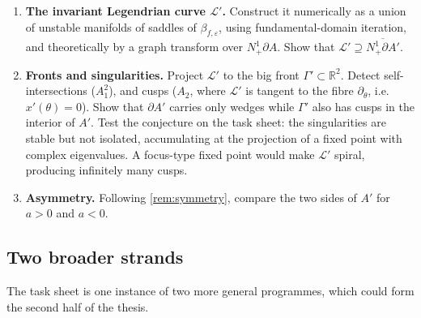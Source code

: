 \documentclass[11pt,a4paper]{article}
\theoremstyle{definition}
\theoremstyle{remark}
\newcommand{\R}{\mathbb{R}}
\newcommand{\eps}{\varepsilon}
\newcommand{\Nb}{N^1_+\partial A}
\begin{document}
\begin{enumerate}[label=\textbf{(\alph*)},leftmargin=*]
  On the opposite side, the pair at $p_-$ is real for $a>0$, with trace $2\lambda+2a\eps/\lambda$. Its larger member exceeds
  $1$ iff $\operatorname{tr}>1+\rho$, i.e.\ iff $a\eps>\lambda(1-\lambda)^2/2$. This is \emph{the same threshold} at which the
  extra fixed points of~(a) appear, with $n_1\to-1$ as $a\eps\downarrow\lambda(1-\lambda)^2/2$. This strongly suggests a pitchfork
  bifurcation at $p_-$ (reflection-symmetric, hence a pitchfork) that turns $p_-$ into a saddle and creates the two new
  sinks. Numerically, at $\lambda=0.6$, $\eps=0.5$, $a=0.2$ the spectrum at $p_-$ is $\{0.36,1.244,0.289\}$.
  It is a natural candidate for singularities born while the eigenvalues are still \emph{real}, which is the task sheet's
  second question. The next steps are to relate the focus at $p_+$ and the saddle at $p_-$ to the geometry of
  $\mathcal{L}'$ near these points.
  \item \textbf{The invariant Legendrian curve $\mathcal{L}'$.} Construct it numerically as a union of unstable
  manifolds of saddles of $\beta_{f,\eps}$, using fundamental-domain iteration, and theoretically by a graph transform
  over $\Nb$. Show that $\mathcal{L}'\supseteq\overline{N^1_+\partial A'}$.
  \item \textbf{Fronts and singularities.} Project $\mathcal{L}'$ to the big front $\Gamma'\subset\R^2$. Detect
  self-intersections ($A_1^2$), and cusps ($A_2$, where $\mathcal{L}'$ is tangent to the fibre $\partial_\theta$, i.e.\
  $x'(\theta)=0$). Show that $\partial A'$ carries only wedges while $\Gamma'$ also has cusps in the interior of $A'$.
  Test the conjecture on the task sheet: the singularities are stable but not isolated, accumulating at the projection
  of a fixed point with complex eigenvalues. A focus-type fixed point would make $\mathcal{L}'$ spiral, producing
  infinitely many cusps.
  \item \textbf{Asymmetry.} Following \cref{rem:symmetry}, compare the two sides of $A'$ for $a>0$ and $a<0$.
\end{enumerate}

\subsection{Two broader strands}\label{sec:strands}
The task sheet is one instance of two more general programmes, which could form the second half of the thesis.
\end{document}
